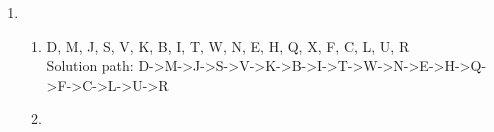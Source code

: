 \documentclass{article}
\begin{document}
\begin{enumerate}
    \item
    \begin{enumerate}
        \item D, M, J, S, V, K, B, I, T, W, N, E, H, Q, X, F, C, L, U, R\\
            Solution path: D->M->J->S->V->K->B->I->T->W->N->E->H->Q->F->C->L->U->R
        \item
    \end{enumerate}
\end{enumerate}
\end{document}

